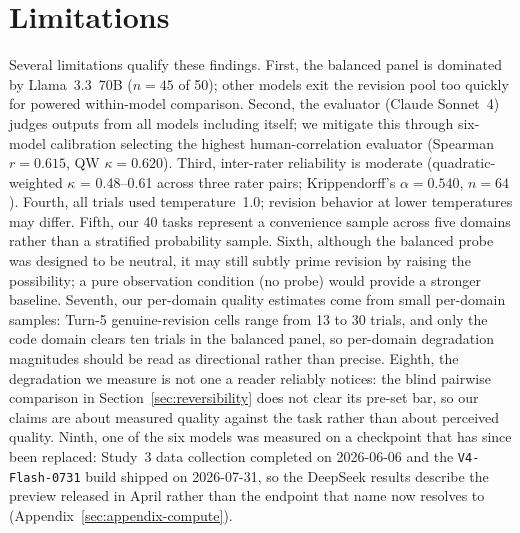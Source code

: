 \section*{Limitations}

Several limitations qualify these findings. First, the balanced panel is dominated by Llama~3.3~70B ($n = 45$ of 50); other models exit the revision pool too quickly for powered within-model comparison. Second, the evaluator (Claude Sonnet~4) judges outputs from all models including itself; we mitigate this through six-model calibration selecting the highest human-correlation evaluator (Spearman $r = 0.615$, QW $\kappa = 0.620$). Third, inter-rater reliability is moderate (quadratic-weighted $\kappa$ = 0.48--0.61 across three rater pairs; Krippendorff's $\alpha = 0.540$, $n = 64$). Fourth, all trials used temperature~1.0; revision behavior at lower temperatures may differ. Fifth, our 40 tasks represent a convenience sample across five domains rather than a stratified probability sample. Sixth, although the balanced probe was designed to be neutral, it may still subtly prime revision by raising the possibility; a pure observation condition (no probe) would provide a stronger baseline. Seventh, our per-domain quality estimates come from small per-domain samples: Turn-5 genuine-revision cells range from 13 to 30 trials, and only the code domain clears ten trials in the balanced panel, so per-domain degradation magnitudes should be read as directional rather than precise. Eighth, the degradation we measure is not one a reader reliably notices: the blind pairwise comparison in Section~\ref{sec:reversibility} does not clear its pre-set bar, so our claims are about measured quality against the task rather than about perceived quality. Ninth, one of the six models was measured on a checkpoint that has since been replaced: Study~3 data collection completed on 2026-06-06 and the \texttt{V4-Flash-0731} build shipped on 2026-07-31, so the DeepSeek results describe the preview released in April rather than the endpoint that name now resolves to (Appendix~\ref{sec:appendix-compute}).
